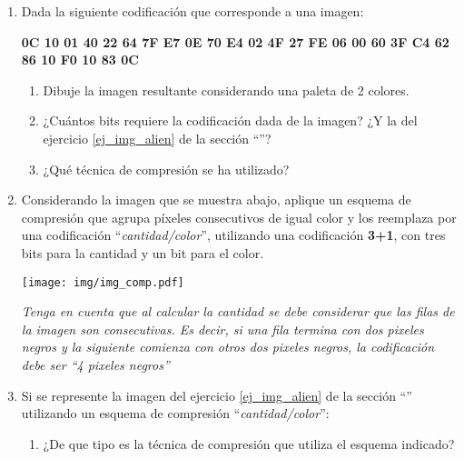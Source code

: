\documentclass[12pt]{article}
\begin{document}
\begin{enumerate}

    \item Dada la siguiente codificación que corresponde a una imagen:

        \textbf{0C 10 01 40 22 64 7F E7 0E 70 E4 02 4F 27 FE 06 00 60 3F C4 62
        86 10 F0 10 83 0C} \label{ej_img_alien_perdida}

        \begin{enumerate}

            \item Dibuje la imagen resultante considerando una paleta de 2 colores.

            \item ¿Cuántos bits requiere la codificación dada de la imagen? ¿Y
                la del ejercicio \ref{ej_img_alien} de la sección
                ``\textbf{}''?

            \item ¿Qué técnica de compresión se ha utilizado?

        \end{enumerate}

    \item Considerando la imagen que se muestra abajo, aplique un esquema de
        compresión que agrupa píxeles consecutivos de igual color y los
        reemplaza por una codificación ``\emph{cantidad/color}'', utilizando
        una codificación \textbf{3+1}, con tres bits para la cantidad y un bit
        para el color.

        \texttt{[image: img/img\_comp.pdf]}

        \textit{Tenga en cuenta que al calcular la cantidad se debe considerar
        que las filas de la imagen son consecutivas. Es decir, si una fila
        termina con dos pixeles negros y la siguiente comienza con otros dos
        pixeles negros, la codificación debe ser ``4 pixeles negros''}

    \item Si se represente la imagen del ejercicio \ref{ej_img_alien} de la
        sección ``\textbf{}'' utilizando un esquema de
        compresión ``\emph{cantidad/color}'':

        \begin{enumerate}

            \item ¿De que tipo es la técnica de compresión que utiliza el
                esquema indicado?


\end{enumerate}
\end{enumerate}
\end{document}
